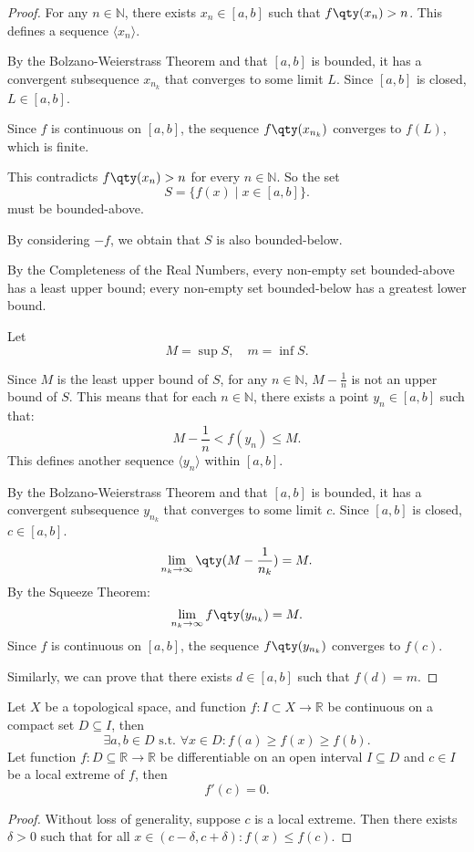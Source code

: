\documentclass[a4paper,12pt]{report}
\begin{document}
\begin{itemize}
\begin{itemize}
\begin{proof}
For any $n\in\mathbb{N}$, there exists $x_n\in [a,b]$ such that $f\qty(x_n)>n$. This defines a sequence $\langle x_n\rangle$.

By the Bolzano-Weierstrass Theorem and that $[a,b]$ is bounded, it has a convergent subsequence $x_{n_k}$ that converges to some limit $L$. Since $[a,b]$ is closed, $L\in [a,b]$.

Since $f$ is continuous on $[a,b]$, the sequence $f\qty(x_{n_k})$ converges to $f(L)$, which is finite.

This contradicts $f\qty(x_n)>n$ for every $n\in\mathbb{N}$. So the set
\[S=\{f(x)\mid x\in [a,b]\}.\]
must be bounded-above.

By considering $-f$, we obtain that $S$ is also bounded-below.

By the Completeness of the Real Numbers, every non-empty set bounded-above has a least upper bound; every non-empty set bounded-below has a greatest lower bound.

Let
\[M=\sup S,\quad m=\inf S.\]

Since $M$ is the least upper bound of $S$, for any $n\in\mathbb{N}$, $M-\frac{1}{n}$ is not an upper bound of $S$. This means that for each $n\in\mathbb{N}$, there exists a point $y_n\in [a,b]$ such that:
\[M-\frac{1}{n}<f(y_n)\leq M.\]
This defines another sequence $\langle y_n\rangle$ within $[a, b]$.

By the Bolzano-Weierstrass Theorem and that $[a,b]$ is bounded, it has a convergent subsequence $y_{n_k}$ that converges to some limit $c$. Since $[a,b]$ is closed, $c\in [a,b]$.
\[\lim_{n_k\to \infty}\qty(M - \frac{1}{n_k}) = M.\]
By the Squeeze Theorem:
\[\lim_{n_k \to \infty} f\qty(y_{n_k}) = M.\]
Since $f$ is continuous on $[a,b]$, the sequence $f\qty(y_{n_k})$ converges to $f(c)$.

Similarly, we can prove that there exists $d\in [a,b]$ such that $f(d)=m$.
\end{proof}
Let $X$ be a topological space, and function $f\colon I\subset X\to\mathbb{R}$ be continuous on a compact set $D\subseteq I$, then
\[\exists a,b \in D \text{\ s.t.\ }\forall x \in D\colon f(a)\geq f(x)\geq f(b).\]
Let function $f\colon D\subseteq\mathbb{R}\to\mathbb{R}$ be differentiable on an open interval $I\subseteq D$ and $c\in I$ be a local extreme of $f$, then
\[f'(c)=0.\]
\begin{proof}
Without loss of generality, suppose $c$ is a local extreme. Then there exists $\delta>0$ such that for all $x\in (c-\delta,c+\delta)\colon f(x)\leq f(c)$.


\end{proof}
\end{itemize}
\end{itemize}
\end{document}
